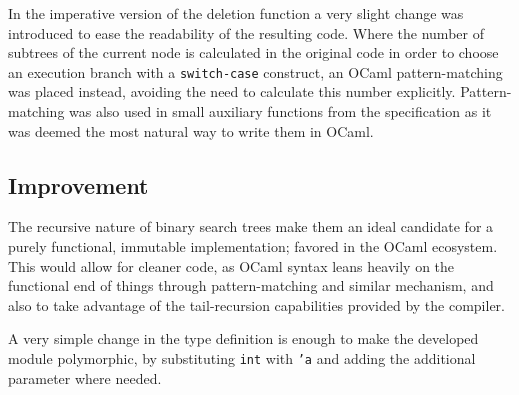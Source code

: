 \documentclass[11pt]{scrartcl} %
\begin{document}
In the imperative version of the deletion function a very slight change was introduced to ease the readability of the resulting code. Where the number of subtrees of the current node is calculated in the original code in order to choose an execution branch with a \texttt{switch-case} construct, an OCaml pattern-matching was placed instead, avoiding the need to calculate this number explicitly. Pattern-matching was also used in small auxiliary functions from the specification as it was deemed the most natural way to write them in OCaml.

\subsection*{Improvement}
The recursive nature of binary search trees make them an ideal candidate for a purely functional, immutable implementation; favored in the OCaml ecosystem. This would allow for cleaner code, as OCaml syntax leans heavily on the functional end of things through pattern-matching and similar mechanism, and also to take advantage of the tail-recursion capabilities provided by the compiler.

A very simple change in the type definition is enough to make the developed module polymorphic, by substituting \texttt{int} with \texttt{'a} and adding the additional parameter where needed.
\end{document}
